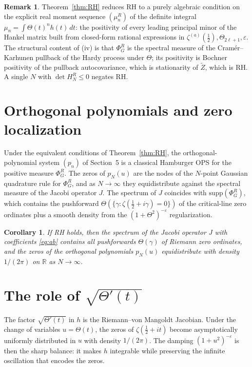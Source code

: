 \documentclass[11pt]{amsart}
\newtheorem{corollary}[theorem]{Corollary}
\theoremstyle{definition}
\newtheorem{remark}[theorem]{Remark}
\begin{document}
\begin{remark}
Theorem~\ref{thm:RH} reduces RH to a purely algebraic condition on the
explicit real moment sequence $(\mu_{n}^{R})$ of the definite integral
$\mu_{n}=\int\Theta(t)^{n}h(t)\,dt$: the positivity of every leading
principal minor of the Hankel matrix built from closed-form rational
expressions in $\zeta^{(a)}(\tfrac12),\Theta_{2\ell+1},\varepsilon$. The
structural content of (iv) is that $\Phi_{G}^{R}$ is the spectral measure
of the Cram\'er--Karhunen pullback of the Hardy process under $\Theta$;
its positivity is Bochner positivity of the pullback autocovariance, which
is stationarity of $\widetilde{Z}$, which is RH. A single $N$ with $\det
H_{N}^{R}\le 0$ negates RH.
\end{remark}

\section{Orthogonal polynomials and zero localization}

Under the equivalent conditions of Theorem~\ref{thm:RH}, the
orthogonal-polynomial system $(p_{n})$ of Section~5 is a classical
Hamburger OPS for the positive measure $\Phi_{G}^{R}$. The zeros of
$p_{N}(u)$ are the nodes of the $N$-point Gaussian quadrature rule for
$\Phi_{G}^{R}$, and as $N\to\infty$ they equidistribute against the
spectral measure of the Jacobi operator $J$. The spectrum of $J$ coincides
with $\mathrm{supp}(\Phi_{G}^{R})$, which contains the pushforward
$\Theta(\{\gamma:\zeta(\tfrac12+i\gamma)=0\})$ of the critical-line zero
ordinates plus a smooth density from the $(1+\Theta^{2})^{-\varepsilon}$
regularization.

\begin{corollary}
If RH holds, then the spectrum of the Jacobi operator $J$ with coefficients
\eqref{eq:ab} contains all pushforwards $\Theta(\gamma)$ of Riemann zero
ordinates, and the zeros of the orthogonal polynomials $p_{N}(u)$
equidistribute with density $1/(2\pi)$ on $\mathbb{R}$ as $N\to\infty$.
\end{corollary}

\section{The role of $\sqrt{\Theta'(t)}$}

The factor $\sqrt{\Theta'(t)}$ in $h$ is the Riemann--von Mangoldt Jacobian.
Under the change of variables $u=\Theta(t)$, the zeros of
$\zeta(\tfrac12+it)$ become asymptotically uniformly distributed in $u$
with density $1/(2\pi)$. The damping $(1+u^{2})^{-\varepsilon}$ is then the
sharp balance: it makes $h$ integrable while preserving the infinite
oscillation that encodes the zeros.
\end{document}
